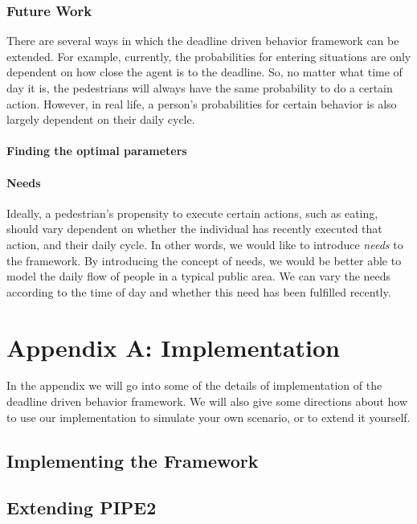 \documentclass[11pt]{book}
\begin{document}
\subsection{Future Work}
There are several ways in which the deadline driven behavior framework can be extended. For example, currently, the probabilities for entering situations are only dependent on how close the agent is to the deadline. So, no matter what time of day it is, the pedestrians will always have the same probability to do a certain action. However, in real life, a person's probabilities for certain behavior is also largely dependent on their daily cycle.

\subsubsection{Finding the optimal parameters}

\subsubsection{Needs}
Ideally, a pedestrian's propensity to execute certain actions, such as eating, should vary dependent on whether the individual has recently executed that action, and their daily cycle. In other words, we would like to introduce \emph{needs} to the framework. By introducing the concept of needs, we would be better able to model the daily flow of people in a typical public area. We can vary the needs according to the time of day and whether this need has been fulfilled recently.

\appendix

\chapter{Appendix A: Implementation}
In the appendix we will go into some of the details of implementation of the deadline driven behavior framework. We will also give some directions about how to use our implementation to simulate your own scenario, or to extend it yourself.


\section{Implementing the Framework}


\section{Extending PIPE2}
\end{document}
